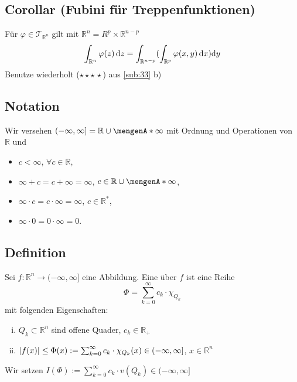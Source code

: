 \subsection{Corollar (Fubini für Treppenfunktionen)} %
\label{sub:34}
Für $\varphi \in \mathcal{T}_{\mathds{R}^n}$ gilt mit $\mathds{R}^n = R^{p} \times \mathds{R}^{n-p} $
\[
	\int_{\mathbb{R}^n} \varphi(z)  \, \mathrm{d}z = \int_{\mathbb{R}^{n-p}} (\int_{\mathbb{R}^p} \varphi(x,y)  \, \mathrm{d}x ) \mathrm{d}y
\]
Benutze wiederholt ($\star\star\star\,\star$) aus \ref{sub:33} b) \bewende

\subsection[Notation für den Funktionswert $\infty$]{Notation} %
\label{sub:35}
Wir versehen $(- \infty, \infty] = \mathds{R} \cup \set{\infty} $ mit Ordnung und Operationen von $\mathds{R}$ und 
\begin{multicols}{2}
	\begin{itemize}
		\item $c < \infty$, $\forall c \in \mathds{R}$,
		\item $\infty+c = c + \infty = \infty$, $c \in \mathds{R} \cup \set{\infty} $,
		\item $\infty \cdot c = c \cdot \infty = \infty$, $c \in \mathds{R}^*$,
		\item $\infty \cdot  0 = 0 \cdot \infty = 0$.
	\end{itemize}
\end{multicols}

\subsection[Definition: Treppe]{Definition} %
\label{sub:36}
Sei $f : \mathds{R}^n \to (- \infty, \infty]$ eine Abbildung. Eine  über $f$ ist eine Reihe
\[
	\Phi = \sum_{k=0}^{\infty} c_k \cdot \chi_{Q_k}
\] 
mit folgenden Eigenschaften: 
\begin{enumerate}[(i)]
	\item $Q_k \subset \mathds{R}^n$ sind offene Quader, $c_k \in \mathds{R}_+$
	\item $\lvert f(x)\rvert \le \Phi(x) := \sum_{k=0}^{\infty} c_k \cdot \chi_{Q_k}(x)  \in (- \infty, \infty] $, $x \in \mathds{R}^n$
\end{enumerate}
Wir setzen $I(\Phi) := \sum_{k=0}^{\infty} c_k \cdot v(Q_k) \in (- \infty, \infty]$ 

